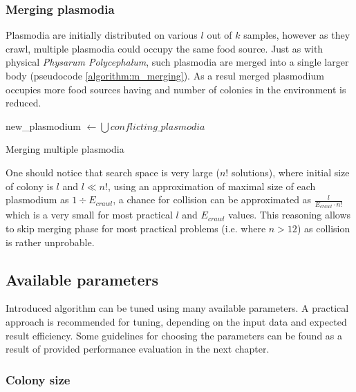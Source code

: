 \subsubsection{Merging plasmodia}

Plasmodia are initially distributed on various $l$ out of $k$ samples, however as they crawl, multiple plasmodia could occupy the same food source. Just as with physical \textit{Physarum Polycephalum}, such plasmodia are merged into a single larger body (pseudocode \ref{algorithm:m_merging}). As a resul merged plasmodium occupies more food sources having and number of colonies in the environment is reduced. 

\begin{algorithm}
  \BlankLine
  
  new\_plasmodium $\leftarrow \bigcup{conflicting\_plasmodia}$\;


  \;

  \caption{Merging multiple plasmodia}
  \label{algorithm:m_merging}
\end{algorithm}

One should notice that search space is very large ($n!$ solutions), where initial size of colony is $l$ and $l \ll n!$, using an approximation of maximal size of each plasmodium as $1 \div E_{crawl}$, a chance for collision can be approximated as $\frac{l}{E_{crawl} \cdot n!}$ which is a very small for most practical $l$ and $E_{crawl}$ values. This reasoning allows to skip merging phase for most practical problems (i.e. where $n > 12$) as collision is rather unprobable.


\subsection{Available parameters}

Introduced algorithm can be tuned using many available parameters. A practical approach is recommended for tuning, depending on the input data and expected result efficiency. Some guidelines for choosing the parameters can be found as a result of provided performance evaluation in the next chapter.

\subsubsection{Colony size}

